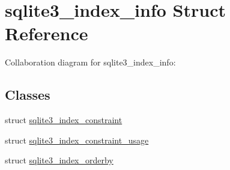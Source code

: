 \hypertarget{structsqlite3__index__info}{}\section{sqlite3\+\_\+index\+\_\+info Struct Reference}
\label{structsqlite3__index__info}


Collaboration diagram for sqlite3\+\_\+index\+\_\+info\+:
\subsection*{Classes}
\begin{DoxyCompactItemize}
\item 
struct \hyperlink{structsqlite3__index__info_1_1sqlite3__index__constraint}{sqlite3\+\_\+index\+\_\+constraint}
\item 
struct \hyperlink{structsqlite3__index__info_1_1sqlite3__index__constraint__usage}{sqlite3\+\_\+index\+\_\+constraint\+\_\+usage}
\item 
struct \hyperlink{structsqlite3__index__info_1_1sqlite3__index__orderby}{sqlite3\+\_\+index\+\_\+orderby}
\end{DoxyCompactItemize}
